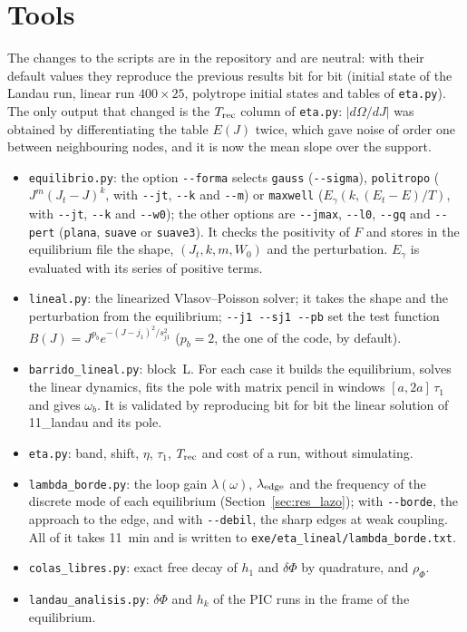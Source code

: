 \documentclass[11pt,a4paper]{article}
\begin{document}
\section{Tools}
\label{sec:herramientas}

The changes to the scripts are in the repository and are neutral: with their default
values they reproduce the previous results bit for bit (initial state of the Landau run,
linear run $400\times25$, polytrope initial states and tables of \texttt{eta.py}). The only
output that changed is the $T_{\rm rec}$ column of \texttt{eta.py}: $|d\Omega/dJ|$ was obtained by
differentiating the table $E(J)$ twice, which gave noise of order one between
neighbouring nodes, and it is now the mean slope over the support.

\begin{itemize}
\item \texttt{equilibrio.py}: the option \texttt{-{}-forma} selects \texttt{gauss}
(\texttt{-{}-sigma}), \texttt{politropo} ($J^m(J_t-J)^k$, with \texttt{-{}-jt}, \texttt{-{}-k} and
\texttt{-{}-m}) or \texttt{maxwell} ($E_\gamma(k,(E_t-E)/T)$, with \texttt{-{}-jt}, \texttt{-{}-k} and
\texttt{-{}-w0}); the other options are \texttt{-{}-jmax}, \texttt{-{}-l0}, \texttt{-{}-gq} and
\texttt{-{}-pert} (\texttt{plana}, \texttt{suave} or \texttt{suave3}). It checks the positivity of $F$
and stores in the equilibrium file the shape, $(J_t,k,m,W_0)$ and the perturbation.
$E_\gamma$ is evaluated with its series of positive terms.
\item \texttt{lineal.py}: the linearized Vlasov--Poisson solver; it takes the shape and
the perturbation from the equilibrium; \texttt{-{}-j1 -{}-sj1 -{}-pb} set the test function
$B(J)=J^{p_b}e^{-(J-j_1)^2/s_{j1}^2}$ ($p_b=2$, the one of the code, by default).
\item \texttt{barrido\_\allowbreak lineal.py}: block~L. For each case it builds the
equilibrium, solves the linear dynamics, fits the pole with matrix pencil in windows
$[a,2a]\,\tau_1$ and gives $\omega_b$. It is validated by reproducing bit for bit the linear
solution of 11\_landau and its pole.
\item \texttt{eta.py}: band, shift, $\eta$, $\tau_1$, $T_{\rm rec}$ and cost of a run, without
simulating.
\item \texttt{lambda\_\allowbreak borde.py}: the loop gain $\lambda(\omega)$, $\lambda_{\rm edge}$ and the frequency of
the discrete mode of each equilibrium (Section~\ref{sec:res_lazo}); with \texttt{-{}-borde}, the
approach to the edge, and with \texttt{-{}-debil}, the sharp edges at weak coupling. All of it
takes \SI{11}{min} and is written to \texttt{exe/\allowbreak eta\_\allowbreak lineal/\allowbreak lambda\_\allowbreak borde.txt}.
\item \texttt{colas\_\allowbreak libres.py}: exact free decay of $h_1$ and $\delta\Phi$ by quadrature,
and $\rho_\Phi$.
\item \texttt{landau\_\allowbreak analisis.py}: $\delta\Phi$ and $h_k$ of the PIC runs in the frame of
the equilibrium.
\end{itemize}
\end{document}

